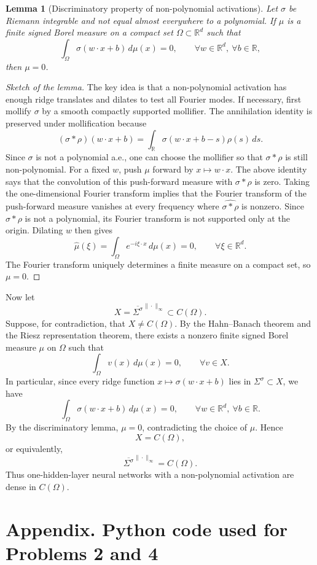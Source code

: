 \documentclass[11pt]{article}
\newtheorem*{lemma}{Lemma}
\newcommand{\R}{\mathbb{R}}
\begin{document}
\begin{lemma}[Discriminatory property of non-polynomial activations]
Let $\sigma$ be Riemann integrable and not equal almost everywhere to a polynomial. If $\mu$ is a finite signed Borel measure on a compact set $\Omega\subset\R^d$ such that
\[
  \int_\Omega \sigma(w\cdot x+b)\,d\mu(x)=0,
  \qquad \forall w\in\R^d,\ \forall b\in\R,
\]
then $\mu=0$.
\end{lemma}

\begin{proof}[Sketch of the lemma]
The key idea is that a non-polynomial activation has enough ridge translates and dilates to test all Fourier modes. If necessary, first mollify $\sigma$ by a smooth compactly supported mollifier. The annihilation identity is preserved under mollification because
\[
  (\sigma*\rho)(w\cdot x+b)
  =\int_\R \sigma(w\cdot x+b-s)\rho(s)\,ds.
\]
Since $\sigma$ is not a polynomial a.e., one can choose the mollifier so that $\sigma*\rho$ is still non-polynomial. For a fixed $w$, push $\mu$ forward by $x\mapsto w\cdot x$. The above identity says that the convolution of this push-forward measure with $\sigma*\rho$ is zero. Taking the one-dimensional Fourier transform implies that the Fourier transform of the push-forward measure vanishes at every frequency where $\widehat{\sigma*\rho}$ is nonzero. Since $\sigma*\rho$ is not a polynomial, its Fourier transform is not supported only at the origin. Dilating $w$ then gives
\[
  \widehat{\mu}(\xi)=\int_\Omega e^{-i\xi\cdot x}\,d\mu(x)=0,
  \qquad \forall \xi\in\R^d.
\]
The Fourier transform uniquely determines a finite measure on a compact set, so $\mu=0$.
\end{proof}

Now let
\[
  X=\overline{\Sigma^\sigma}^{\|\cdot\|_\infty}\subset C(\Omega).
\]
Suppose, for contradiction, that $X\ne C(\Omega)$. By the Hahn--Banach theorem and the Riesz representation theorem, there exists a nonzero finite signed Borel measure $\mu$ on $\Omega$ such that
\[
  \int_\Omega v(x)\,d\mu(x)=0,
  \qquad \forall v\in X.
\]
In particular, since every ridge function $x\mapsto \sigma(w\cdot x+b)$ lies in $\Sigma^\sigma\subset X$, we have
\[
  \int_\Omega \sigma(w\cdot x+b)\,d\mu(x)=0,
  \qquad \forall w\in\R^d,\ \forall b\in\R.
\]
By the discriminatory lemma, $\mu=0$, contradicting the choice of $\mu$. Hence
\[
  X=C(\Omega),
\]
or equivalently,
\[
  \boxed{
  \overline{\Sigma^\sigma}^{\|\cdot\|_\infty}=C(\Omega).
  }
\]
Thus one-hidden-layer neural networks with a non-polynomial activation are dense in $C(\Omega)$.

\appendix
\section*{Appendix. Python code used for Problems 2 and 4}


\end{document}
